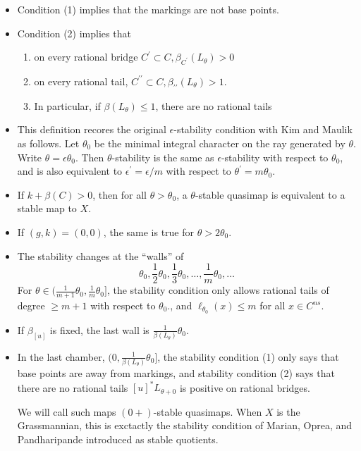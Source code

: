 \documentclass{amsart}
\theoremstyle{definition}
\begin{document}
\begin{itemize}

\item Condition (1) implies that the markings are not base points.
\item Condition (2) implies that 
\begin{enumerate}
\item on every rational bridge $C^\prime\subset C, \beta_{C^\prime}(L_\theta)>0$
\item on every rational tail, $C^{\prime\prime}\subset C, \beta_{{\prime\prime}}(L_\theta)>1$.
\item In particular, if $\beta(L_\theta)\leq 1$, there are no rational tails

\end{enumerate}
\item This definition recores the original $\epsilon$-stability condition with Kim and Maulik as follows.  Let $\theta_0$ be the minimal integral character on the ray generated by $\theta$.  Write $\theta=\epsilon\theta_0$.  Then $\theta$-stability is the same as $\epsilon$-stability with respect to $\theta_0$, and is also equivalent to $\epsilon^\prime=\epsilon/m$ with respect to $\theta^\prime=m\theta_0$.
\item If $k+\beta(C)>0$, then for all $\theta>\theta_0$, a $\theta$-stable quasimap is equivalent to a stable map to $X$.
\item If $(g,k)=(0,0)$, the same is true for $\theta>2\theta_0$.
\item The stability changes at the ``walls'' of $$\theta_0, \frac{1}{2}\theta_0, \frac{1}{3}\theta_0, \dots, \frac{1}{m}\theta_0,\dots$$
For $\theta\in (\frac{1}{m+1}\theta_0,\frac{1}{m}\theta_0]$, the stability condition only allows rational tails of degree $\geq m+1$ with respect to $\theta_0$., and $\ell_{\theta_0}(x)\leq m$ for all $x\in C^{ns}$.
\item
If $\beta_{[u]}$ is fixed, the last wall is $\frac{1}{\beta(L_\theta)}\theta_0$.
\item
In the last chamber, $(0, \frac{1}{\beta(L_{\theta})}\theta_0]$, the stability condition (1) only says that base points are away from markings, and stability condition (2) says that there are no rational tails $[u]^*L_{\theta+0}$ is positive on rational bridges.

We will call such maps $(0+)$-stable quasimaps.  When $X$ is the Grassmannian, this is exctactly the stability condition of Marian, Oprea, and Pandharipande introduced as stable quotients.
\end{itemize}
\end{document}
